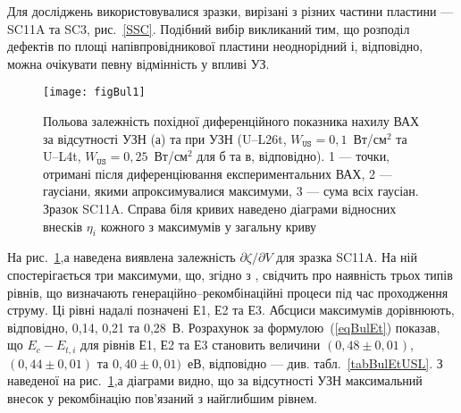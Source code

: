 Для досліджень використовувалися зразки, вирізані з різних частини пластини --- SC11A та SC3, рис.~\ref{SSC}.
Подібний вибір викликаний тим, що розподіл дефектів по площі напівпровідникової пластини неоднорідний і, відповідно, можна очікувати певну відмінність у впливі УЗ.

\begin{figure}
\center
\texttt{[image: figBul1]}
\caption{\label{figBul1}
Польова залежність похідної диференційного показника нахилу ВАХ за відсутності УЗН (а)
та при УЗН (U--L26t, $W_\mathtt{US}=0,1$~Вт/см$^2$ та U--L4t,  $W_\mathtt{US}=0,25$~Вт/см$^2$ для б та в, відповідно).
1 --- точки, отримані після диференціювання експериментальних ВАХ,
2 --- гаусіани, якими апроксимувалися максимуми,
3 --- сума всіх гаусіан.
Зразок SC11A.
Справа біля кривих наведено діаграми відносних внесків $\eta_i$ кожного з максимумів у загальну криву
}%
\end{figure}

На рис.~\ref{figBul1},а наведена виявлена залежність $\partial \zeta/ \partial V $ для зразка SC11A.
На ній спостерігається три максимуми, що, згідно з \cite{Bulyar}, свідчить про наявність
трьох типів рівнів, що визначають генераційно--рекомбінаційні процеси під час проходження струму.
Ці рівні надалі позначені Е1, Е2 та Е3.
Абсциси максимумів дорівнюють, відповідно, 0,14, 0,21 та 0,28~В.
Розрахунок за формулою~(\ref{eqBulEt}) показав,
що  $E_c-E_{t,i}$ для рівнів  Е1, Е2 та Е3 становить величини $(0,48\pm0,01)$, $(0,44\pm0,01)$ та $0,40\pm0,01)$~еВ, відповідно --- див. табл.~\ref{tabBulEtUSL}.
З наведеної на рис.~\ref{figBul1},а діаграми видно, що за відсутності УЗН максимальний внесок у рекомбінацію пов'язаний з найглибшим рівнем.





